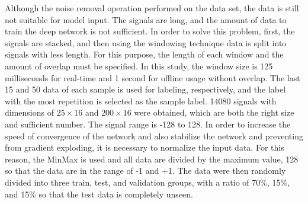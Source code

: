 Although the noise removal operation performed on the data set, the data is still not suitable for model input. The signals are long, and the amount of data to train the deep network is not sufficient. In order to solve this problem, first, the signals are stacked, and then using the windowing technique data is split into signals with less length. For this purpose, the length of each window and the amount of overlap must be specified. In this study, the window size is 125 milliseconds for real-time and 1 second for offline usage without overlap. The last 15 and 50 data of each sample is used for labeling, respectively, and the label with the most repetition is selected as the sample label. 14080 signals with dimensions of $25 \times 16$ and $200 \times 16$ were obtained, which are both the right size and sufficient number. The signal range is -128 to 128. In order to increase the speed of convergence of the network and also stabilize the network and preventing from gradient exploding, it is necessary to normalize the input data. For this reason, the MinMax is used and all data are divided by the maximum value, 128 so that the data are in the range of -1 and +1. The data were then randomly divided into three train, test, and validation groups, with a ratio of 70\%, 15\%, and 15\%  so that the test data is completely unseen.